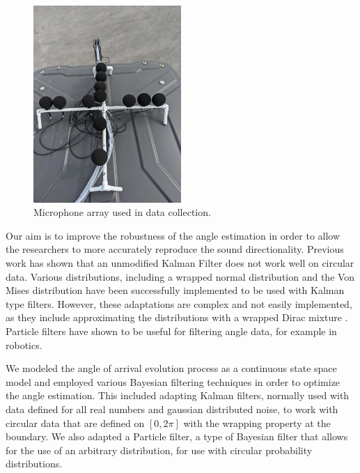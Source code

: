 \documentclass[11pt]{amsart}
\begin{document}
\begin{figure}[htp]
\includegraphics*[width=0.5\textwidth]{Pic of Real Mic Array.jpg}\hfill
\caption{Microphone array used in data collection.}
\label{fig:array}
\end{figure}

Our aim is to improve the robustness of the angle estimation in order to allow the researchers to more accurately reproduce the sound directionality. Previous work has shown that an unmodified Kalman Filter does not work well on circular data\cite{Research}. Various distributions, including a wrapped normal distribution and the Von Mises distribution have been successfully implemented to be used with Kalman type filters. However, these adaptations are complex and not easily implemented, as they include approximating the distributions with a wrapped Dirac mixture \cite{Research}. Particle filters have shown to be useful for filtering angle data, for example in robotics\cite{Oops}.

We modeled the angle of arrival evolution process as a continuous state space model and employed various Bayesian filtering techniques in order to optimize the angle estimation. This included adapting Kalman filters, normally used with data defined for all real numbers and gaussian distributed noise, to work with circular data that are defined on $[0,2\pi]$ with the wrapping property at the boundary. We also adapted a Particle filter, a type of Bayesian filter that allows for the use of an arbitrary distribution, for use with circular probability distributions.

\end{document}
